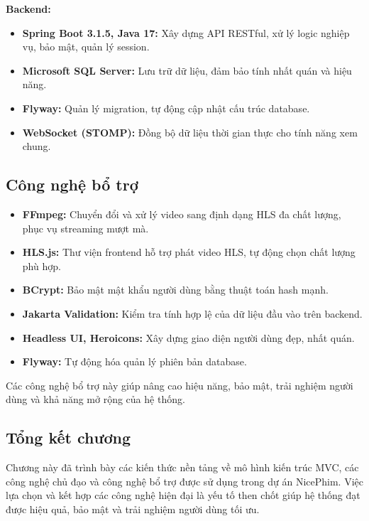 \textbf{Backend:}
\begin{itemize}
	\item \textbf{Spring Boot 3.1.5, Java 17:} Xây dựng API RESTful, xử lý logic nghiệp vụ, bảo mật, quản lý session.
	\item \textbf{Microsoft SQL Server:} Lưu trữ dữ liệu, đảm bảo tính nhất quán và hiệu năng.
	\item \textbf{Flyway:} Quản lý migration, tự động cập nhật cấu trúc database.
	\item \textbf{WebSocket (STOMP):} Đồng bộ dữ liệu thời gian thực cho tính năng xem chung.
\end{itemize}

\subsection{Công nghệ bổ trợ}

\begin{itemize}
	\item \textbf{FFmpeg:} Chuyển đổi và xử lý video sang định dạng HLS đa chất lượng, phục vụ streaming mượt mà.
	\item \textbf{HLS.js:} Thư viện frontend hỗ trợ phát video HLS, tự động chọn chất lượng phù hợp.
	\item \textbf{BCrypt:} Bảo mật mật khẩu người dùng bằng thuật toán hash mạnh.
	\item \textbf{Jakarta Validation:} Kiểm tra tính hợp lệ của dữ liệu đầu vào trên backend.
	\item \textbf{Headless UI, Heroicons:} Xây dựng giao diện người dùng đẹp, nhất quán.
	\item \textbf{Flyway:} Tự động hóa quản lý phiên bản database.
\end{itemize}

Các công nghệ bổ trợ này giúp nâng cao hiệu năng, bảo mật, trải nghiệm người dùng và khả năng mở rộng của hệ thống.

\subsection{Tổng kết chương}

Chương này đã trình bày các kiến thức nền tảng về mô hình kiến trúc MVC, các công nghệ chủ đạo và công nghệ bổ trợ được sử dụng trong dự án NicePhim. Việc lựa chọn và kết hợp các công nghệ hiện đại là yếu tố then chốt giúp hệ thống đạt được hiệu quả, bảo mật và trải nghiệm người dùng tối ưu.

